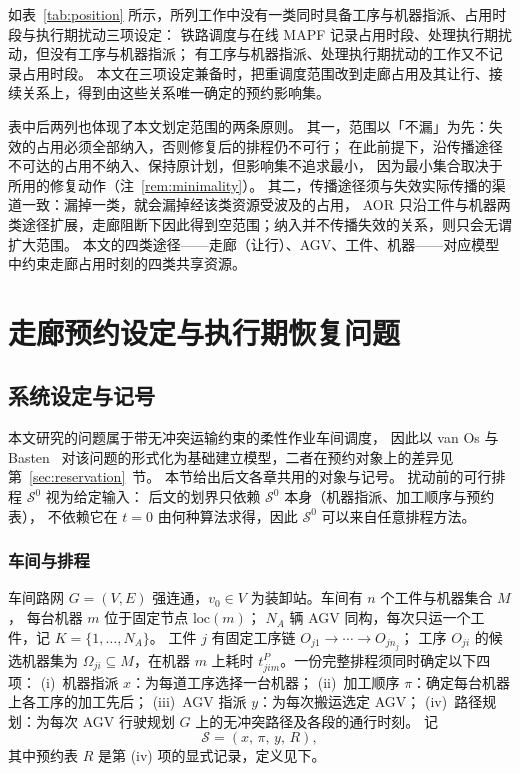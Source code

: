 \documentclass[manuscript,screen,review]{acmart}
\begin{document}
如表~\ref{tab:position} 所示，所列工作中没有一类同时具备工序与机器指派、占用时段与执行期扰动三项设定：
铁路调度与在线 MAPF 记录占用时段、处理执行期扰动，但没有工序与机器指派；
有工序与机器指派、处理执行期扰动的工作又不记录占用时段。
本文在三项设定兼备时，把重调度范围改到走廊占用及其让行、接续关系上，得到由这些关系唯一确定的预约影响集。

表中后两列也体现了本文划定范围的两条原则。
其一，范围以「不漏」为先：失效的占用必须全部纳入，否则修复后的排程仍不可行；
在此前提下，沿传播途径不可达的占用不纳入、保持原计划，但影响集不追求最小，
因为最小集合取决于所用的修复动作（注~\ref{rem:minimality}）。
其二，传播途径须与失效实际传播的渠道一致：漏掉一类，就会漏掉经该类资源受波及的占用，
AOR 只沿工件与机器两类途径扩展，走廊阻断下因此得到空范围；纳入并不传播失效的关系，则只会无谓扩大范围。
本文的四类途径——走廊（让行）、AGV、工件、机器——对应模型中约束走廊占用时刻的四类共享资源。

\section{走廊预约设定与执行期恢复问题}
\label{sec:problem}

\subsection{系统设定与记号}
\label{sec:system_brief}

本文研究的问题属于带无冲突运输约束的柔性作业车间调度，
因此以 van Os 与 Basten~\cite{vanos2026exact} 对该问题的形式化为基础建立模型，二者在预约对象上的差异见第~\ref{sec:reservation}~节。
本节给出后文各章共用的对象与记号。
扰动前的可行排程 \(\mathcal{S}^0\) 视为给定输入：
后文的划界只依赖 \(\mathcal{S}^0\) 本身（机器指派、加工顺序与预约表），
不依赖它在 \(t=0\) 由何种算法求得，因此 \(\mathcal{S}^0\) 可以来自任意排程方法。

\subsubsection{车间与排程}
\label{sec:shop}

车间路网 \(G=(V,E)\) 强连通，\(v_0\in V\) 为装卸站。车间有 \(n\) 个工件与机器集合 \(M\)，
每台机器 \(m\) 位于固定节点 \(\mathrm{loc}(m)\)；
\(N_A\) 辆 AGV 同构，每次只运一个工件，记 \(K=\{1,\ldots,N_A\}\)。
工件 \(j\) 有固定工序链 \(O_{j1}\to\cdots\to O_{jn_j}\)；
工序 \(O_{ji}\) 的候选机器集为 \(\Omega_{ji}\subseteq M\)，在机器 \(m\) 上耗时
\(t^P_{jim}\)。一份完整排程须同时确定以下四项：
(i)~机器指派 \(x\)：为每道工序选择一台机器；
(ii)~加工顺序 \(\pi\)：确定每台机器上各工序的加工先后；
(iii)~AGV 指派 \(y\)：为每次搬运选定 AGV；
(iv)~路径规划：为每次 AGV 行驶规划 \(G\) 上的无冲突路径及各段的通行时刻。
记
\[
\mathcal{S}=(x,\,\pi,\,y,\,R),
\]
其中预约表 \(R\) 是第 (iv) 项的显式记录，定义见下。
\end{document}
